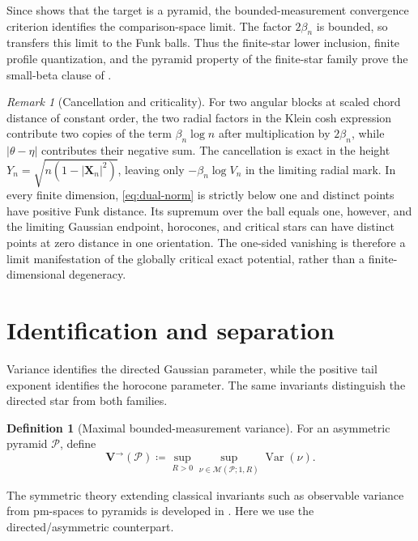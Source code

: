 \documentclass{amsart}
\numberwithin{equation}{section}
\theoremstyle{plain}
\theoremstyle{definition}
\newtheorem{definition}[theorem]{Definition}
\theoremstyle{remark}
\newtheorem{remark}[theorem]{Remark}
\newcommand{\Var}{\operatorname{Var}}
\begin{document}
Since  shows that the target is a pyramid, the bounded-measurement convergence criterion identifies the comparison-space limit.  The factor $2\beta_n$ is bounded, so  transfers this limit to the Funk balls.  Thus the finite-star lower inclusion, finite profile quantization, and the pyramid property of the finite-star family prove the small-beta clause of .

\begin{remark}[Cancellation and criticality]\label{rem:cancellation-criticality}
For two angular blocks at scaled chord distance of constant order, the two radial factors in the Klein cosh expression contribute two copies of the term $\beta_n\log n$ after multiplication by $2\beta_n$, while $|\theta-\eta|$ contributes their negative sum.  The cancellation is exact in the height $Y_n=\sqrt{n(1-|\mathbf X_n|^2)}$, leaving only $-\beta_n\log V_n$ in the limiting radial mark.  In every finite dimension, \eqref{eq:dual-norm} is strictly below one and distinct points have positive Funk distance.  Its supremum over the ball equals one, however, and the limiting Gaussian endpoint, horocones, and critical stars can have distinct points at zero distance in one orientation.  The one-sided vanishing is therefore a limit manifestation of the globally critical exact potential, rather than a finite-dimensional degeneracy.
\end{remark}

\section{Identification and separation}\label{sec:identification-separation}

Variance identifies the directed Gaussian parameter, while the positive tail exponent identifies the horocone parameter.  The same invariants distinguish the directed star from both families.

\begin{definition}[Maximal bounded-measurement variance]\label{def:variance-invariant}
For an asymmetric pyramid $\mathcal P$, define
\[ \mathbf{V}^{\to}(\mathcal P) \coloneqq\sup_{R>0}\sup_{\nu\in\mathcal M(\mathcal P;1,R)}\Var(\nu). \]
\end{definition}
The symmetric theory extending classical invariants such as observable variance from pm-spaces to pyramids is developed in \cite{esaki-kazukawa-mitsuishi2024invariants}.  Here we use the directed/asymmetric counterpart.
\end{document}
